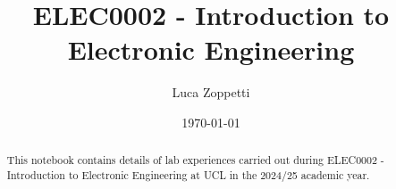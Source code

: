 \documentclass{article}
\author{Luca Zoppetti}
\title{ELEC0002 - Introduction to Electronic Engineering}
\date{\today}
\begin{document}
\maketitle
\begin{abstract}
	This notebook contains details of lab experiences carried out during ELEC0002 - Introduction to Electronic Engineering at UCL in the 2024/25 academic year.
\end{abstract}
\tableofcontents


\end{document}
